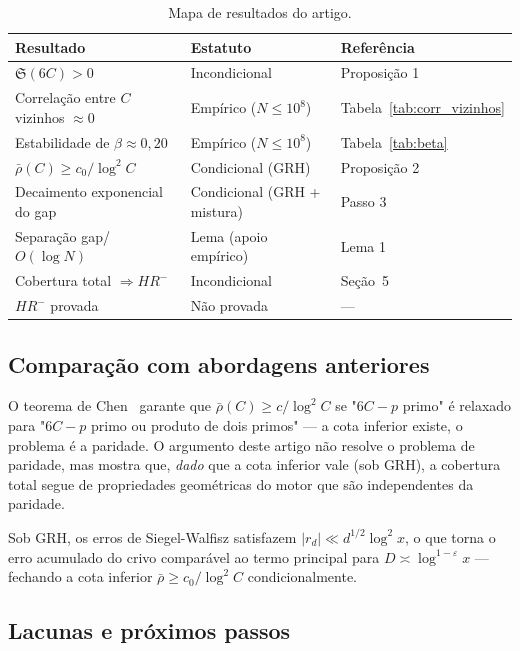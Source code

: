 \documentclass[11pt]{article}
\theoremstyle{definition}
\begin{document}
	\begin{table}[h]
		\centering
		\caption{Mapa de resultados do artigo.}
		\label{tab:mapa}
		\begin{tabular}{lll}
			\toprule
			Resultado & Estatuto & Referência \\
			\midrule
			$\mathfrak{S}(6C)>0$ & Incondicional & Proposição 1 \\
			Correlação entre $C$ vizinhos $\approx 0$ & Empírico ($N\le10^8$) & Tabela~\ref{tab:corr_vizinhos} \\
			Estabilidade de $\beta\approx0{,}20$ & Empírico ($N\le10^8$) & Tabela~\ref{tab:beta} \\
			$\bar\rho(C)\ge c_0/\log^2 C$ & Condicional (GRH) & Proposição 2 \\
			Decaimento exponencial do gap & Condicional (GRH + mistura) & Passo 3 \\
			Separação gap/$O(\log N)$ & Lema (apoio empírico) & Lema 1 \\
			Cobertura total $\Rightarrow HR^-$ & Incondicional & Seção~5 \\
			$HR^-$ provada & Não provada & — \\
			\bottomrule
		\end{tabular}
	\end{table}
	
	\subsection{Comparação com abordagens anteriores}
	
	O teorema de Chen~\cite{chen} garante que $\bar\rho(C)\ge c/\log^2 C$ se "$6C-p$ primo" é relaxado para "$6C-p$ primo ou produto de dois primos" — a cota inferior existe, o problema é a paridade. O argumento deste artigo não resolve o problema de paridade, mas mostra que, \emph{dado} que a cota inferior vale (sob GRH), a cobertura total segue de propriedades geométricas do motor que são independentes da paridade.
	
	Sob GRH, os erros de Siegel-Walfisz satisfazem $|r_d|\ll d^{1/2}\log^2 x$, o que torna o erro acumulado do crivo comparável ao termo principal para $D\asymp\log^{1-\varepsilon}x$ — fechando a cota inferior $\bar\rho\ge c_0/\log^2 C$ condicionalmente.
	
	\subsection{Lacunas e próximos passos}
	
\end{document}
